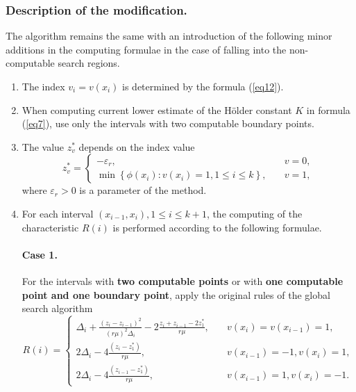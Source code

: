 \documentclass[runningheads]{llncs}
\begin{document}
\subsubsection{Description of the modification.} The algorithm remains the same with an introduction of the following minor additions in the computing formulae in the case of falling into the non-computable search regions.
\begin{enumerate} 
  \item The index $v_i=v(x_i)$ is determined by the formula (\ref{eq12}).
  \item When computing current lower estimate of the H{\"o}lder constant $K$ in formula (\ref{eq7}), use only the intervals with two computable boundary points.
  \item The value $z_v^*$ depends on the index value
\begin{equation}\label{eq20} 
z_v^*=
  \begin{cases}
    -\varepsilon _r, & {\quad v=0 ,}\\
    \min \left\{ \phi (x_i): v(x_i)=1, 1 \leq i \leq k \right\}, & {\quad v=1 ,}
  \end{cases}
\end{equation}
where $\varepsilon _r > 0$ is a parameter of the method.

  \item For each interval $(x_{i-1}, x_i), 1 \leq i \leq k+1$, the computing of the characteristic $R(i)$ is performed according to the following formulae.
      
        \paragraph{Case 1.} For the intervals with \textbf{two computable points} or with \textbf{one computable point and one boundary point}, apply the original rules of the global search algorithm
\begin{equation}\label{eq21} 
R(i)=
  \begin{cases}
     \Delta _i+\frac {{(z_i-z_{i-1})}^2}{{(r \mu)}^2 \Delta _i} - 2 \frac {z_i+z_{i-1}-2z_1^*}{r \mu}, & {\quad  v(x_i)=v(x_{i-1})=1,}\\
    2 \Delta _i-4 \frac {(z_i-z_1^*)}{r \mu}, & {\quad  v(x_{i-1})=-1, v(x_i)=1,}\\
    2 \Delta _i-4 \frac {(z_{i-1}-z_1^*)}{r \mu}, & {\quad  v(x_{i-1})=1, v(x_i)=-1.}
  \end{cases}
\end{equation}

\end{enumerate}
\end{document}
